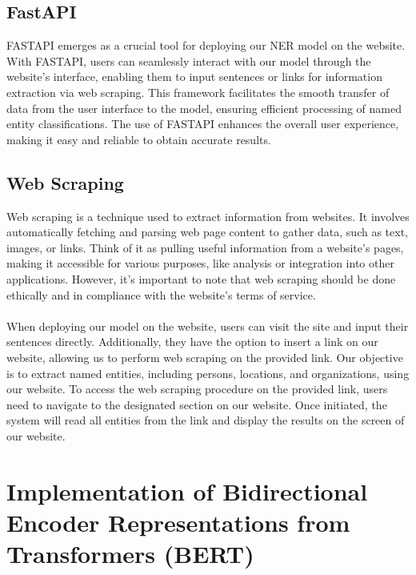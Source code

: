 \subsection{FastAPI}

FASTAPI emerges as a crucial tool for deploying our NER model on the website. With FASTAPI, users can seamlessly interact with our model through the website's interface, enabling them to input sentences or links for information extraction via web scraping. This framework facilitates the smooth transfer of data from the user interface to the model, ensuring efficient processing of named entity classifications. The use of FASTAPI enhances the overall user experience, making it easy and reliable to obtain accurate results.

\subsection{Web Scraping}
Web scraping is a technique used to extract information from websites. It involves automatically fetching and parsing web page content to gather data, such as text, images, or links. Think of it as pulling useful information from a website's pages, making it accessible for various purposes, like analysis or integration into other applications. However, it's important to note that web scraping should be done ethically and in compliance with the website's terms of service.\\
\\
When deploying our model on the website, users can visit the site and input their sentences directly. Additionally, they have the option to insert a link on our website, allowing us to perform web scraping on the provided link. Our objective is to extract named entities, including persons, locations, and organizations, using our website. To access the web scraping procedure on the provided link, users need to navigate to the designated section on our website. Once initiated, the system will read all entities from the link and display the results on the screen of our website.

\section{Implementation of Bidirectional Encoder Representations from Transformers (BERT)}

\vspace{20pt}

